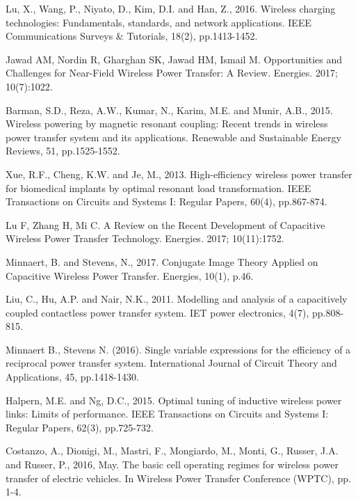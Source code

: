 \documentclass[journal]{IEEEtran}
\begin{document}
\begin{thebibliography}{1}


Lu, X., Wang, P., Niyato, D., Kim, D.I. and Han, Z., 2016. Wireless charging technologies: Fundamentals, standards, and network applications. IEEE Communications Surveys \& Tutorials, 18(2), pp.1413-1452.

Jawad AM, Nordin R, Gharghan SK, Jawad HM, Ismail M. Opportunities and Challenges for Near-Field Wireless Power Transfer: A Review. Energies. 2017; 10(7):1022.

Barman, S.D., Reza, A.W., Kumar, N., Karim, M.E. and Munir, A.B., 2015. Wireless powering by magnetic resonant coupling: Recent trends in wireless power transfer system and its applications. Renewable and Sustainable Energy Reviews, 51, pp.1525-1552.

Xue, R.F., Cheng, K.W. and Je, M., 2013. High-efficiency wireless power transfer for biomedical implants by optimal resonant load transformation. IEEE Transactions on Circuits and Systems I: Regular Papers, 60(4), pp.867-874.

Lu F, Zhang H, Mi C. A Review on the Recent Development of Capacitive Wireless Power Transfer Technology. Energies. 2017; 10(11):1752.

Minnaert, B. and Stevens, N., 2017. Conjugate Image Theory Applied on Capacitive Wireless Power Transfer. Energies, 10(1), p.46.

Liu, C., Hu, A.P. and Nair, N.K., 2011. Modelling and analysis of a capacitively coupled contactless power transfer system. IET power electronics, 4(7), pp.808-815.	


Minnaert B., Stevens N. (2016). Single variable expressions for the efficiency of a reciprocal power transfer system. International Journal of Circuit Theory and Applications, 45, pp.1418-1430.


Halpern, M.E. and Ng, D.C., 2015. Optimal tuning of inductive wireless power links: Limits of performance. IEEE Transactions on Circuits and Systems I: Regular Papers, 62(3), pp.725-732.

Costanzo, A., Dionigi, M., Mastri, F., Mongiardo, M., Monti, G., Russer, J.A. and Russer, P., 2016, May. The basic cell operating regimes for wireless power transfer of electric vehicles. In Wireless Power Transfer Conference (WPTC), pp. 1-4.


\end{thebibliography}
\end{document}
